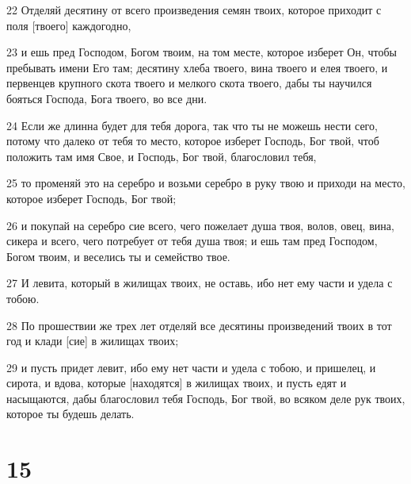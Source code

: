 \par 22 Отделяй десятину от всего произведения семян твоих, которое приходит с поля [твоего] каждогодно,
\par 23 и ешь пред Господом, Богом твоим, на том месте, которое изберет Он, чтобы пребывать имени Его там; десятину хлеба твоего, вина твоего и елея твоего, и первенцев крупного скота твоего и мелкого скота твоего, дабы ты научился бояться Господа, Бога твоего, во все дни.
\par 24 Если же длинна будет для тебя дорога, так что ты не можешь нести сего, потому что далеко от тебя то место, которое изберет Господь, Бог твой, чтоб положить там имя Свое, и Господь, Бог твой, благословил тебя,
\par 25 то променяй это на серебро и возьми серебро в руку твою и приходи на место, которое изберет Господь, Бог твой;
\par 26 и покупай на серебро сие всего, чего пожелает душа твоя, волов, овец, вина, сикера и всего, чего потребует от тебя душа твоя; и ешь там пред Господом, Богом твоим, и веселись ты и семейство твое.
\par 27 И левита, который в жилищах твоих, не оставь, ибо нет ему части и удела с тобою.
\par 28 По прошествии же трех лет отделяй все десятины произведений твоих в тот год и клади [сие] в жилищах твоих;
\par 29 и пусть придет левит, ибо ему нет части и удела с тобою, и пришелец, и сирота, и вдова, которые [находятся] в жилищах твоих, и пусть едят и насыщаются, дабы благословил тебя Господь, Бог твой, во всяком деле рук твоих, которое ты будешь делать.

\chapter{15}

